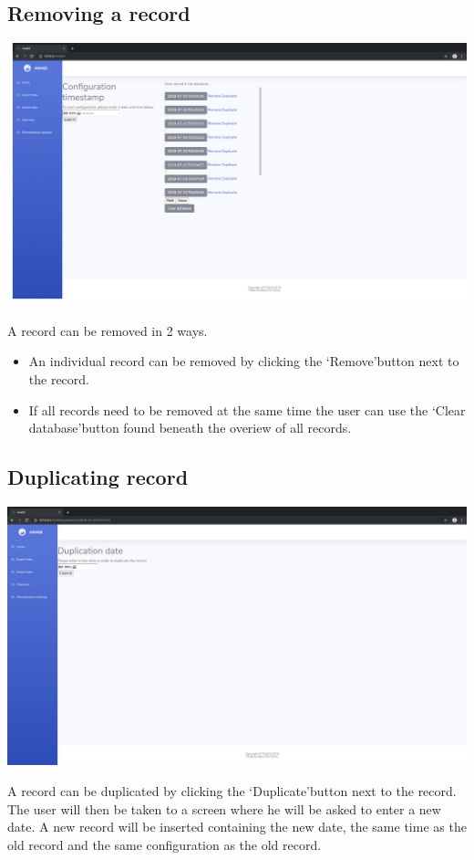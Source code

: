 \documentclass[12pt]{article}
\begin{document}
\subsection{Removing a record}
\begin{center}
	\includegraphics[width=\linewidth]{images/Removing_records.png}
\end{center}
A record can be removed in 2 ways.
\begin{itemize}
	\item An individual record can be removed by clicking the \lq Remove\rq button next to the record.
	\item If all records need to be removed at the same time the user can use the \lq Clear database\rq button found beneath the overiew of all records.
\end{itemize}

\subsection{Duplicating record}
\begin{center}
	\includegraphics[width=\linewidth]{images/Duplicate_records.png}
\end{center}
A record can be duplicated by clicking the \lq Duplicate\rq button next to the record.\\
The user will then be taken to a screen where he will be asked to enter a new date. A new record will be inserted containing the new date, the same time as the old record and the same configuration as the old record.
\end{document}
